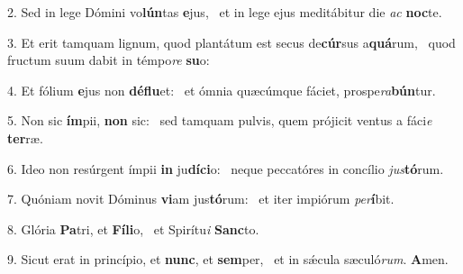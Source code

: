 2. Sed in lege Dómini vo\textbf{lún}tas \textbf{e}jus, \ast\  et in lege ejus meditábitur die \textit{ac} \textbf{noc}te.\

3. Et erit tamquam lignum, quod plantátum est secus de\textbf{cúr}sus a\textbf{quá}rum, \ast\  quod fructum suum dabit in témpo\textit{re} \textbf{su}o:\

4. Et fólium \textbf{e}jus non \textbf{dé}\textbf{flu}et: \ast\  et ómnia quæcúmque fáciet, prospe\textit{ra}\textbf{bún}tur.\

5. Non sic \textbf{ím}pii, \textbf{non} sic: \ast\  sed tamquam pulvis, quem prójicit ventus a fáci\textit{e} \textbf{ter}ræ.\

6. Ideo non resúrgent ímpii \textbf{in} ju\textbf{dí}\textbf{ci}o: \ast\  neque peccatóres in concílio \textit{jus}\textbf{tó}rum.\

7. Quóniam novit Dóminus \textbf{vi}am jus\textbf{tó}rum: \ast\  et iter impiórum \textit{per}\textbf{í}bit.\

8. Glória \textbf{Pa}tri, et \textbf{Fí}\textbf{li}o, \ast\  et Spirítu\textit{i} \textbf{Sanc}to.\

9. Sicut erat in princípio, et \textbf{nunc}, et \textbf{sem}per, \ast\  et in sǽcula sæculó\textit{rum}. \textbf{A}men.\

